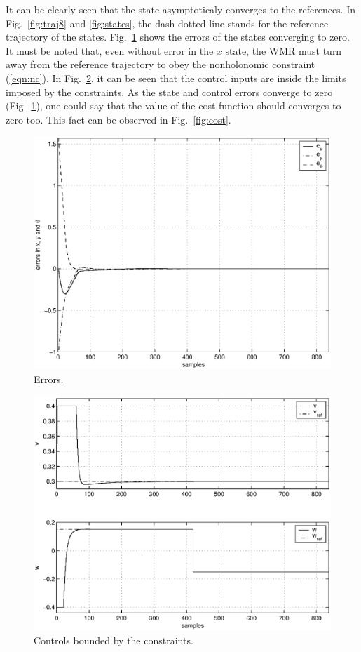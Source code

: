 \documentclass[conference]{IEEEtran} %
\begin{document}
It can be clearly seen that the state asymptoticaly converges to the references. In Fig.~\ref{fig:traj8} and \ref{fig:states}, the dash-dotted line stands for the reference trajectory of the states. Fig.~\ref{fig:errors} shows the errors of the states converging to zero. It must be noted that, even without error in the $x$ state, the WMR must turn away from the reference trajectory to obey the nonholonomic constraint (\ref{eqn:nc}). In Fig.~\ref{fig:controls}, it can be seen that the control inputs are inside the limits imposed by the constraints. As the state and control errors converge to zero (Fig.~\ref{fig:errors}), one could say that the value of the cost function should converges to zero too. This fact can be observed in Fig.~\ref{fig:cost}.
\begin{figure}
	\centering
    \includegraphics[width=.95\linewidth]{Figures/errors.eps}
    \caption{Errors.}
    \label{fig:errors}
\end{figure}
\begin{figure}
	\centering
    \includegraphics[width=.95\linewidth]{Figures/controls.eps}
    \caption{Controls bounded by the constraints.}
    \label{fig:controls}
\end{figure}
\end{document}
